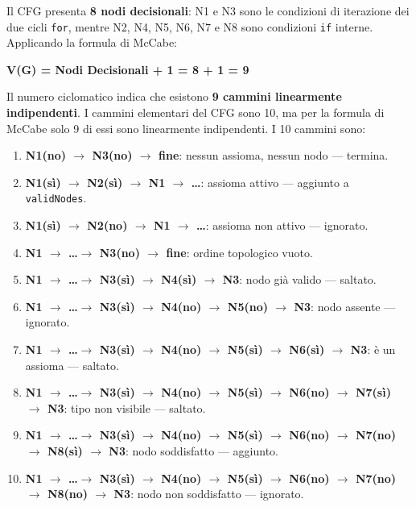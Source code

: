 \documentclass[12pt,a4paper]{article}
\begin{document}
Il CFG presenta \textbf{8 nodi decisionali}: N1 e N3 sono le condizioni di iterazione dei due cicli \texttt{for}, mentre N2, N4, N5, N6, N7 e N8 sono condizioni \texttt{if} interne. Applicando la formula di McCabe:

\textbf{V(G) = Nodi Decisionali + 1 = 8 + 1 = 9}

Il numero ciclomatico indica che esistono \textbf{9 cammini linearmente indipendenti}. I cammini elementari del CFG sono 10, ma per la formula di McCabe solo 9 di essi sono linearmente indipendenti. I 10 cammini sono:

\begin{enumerate}
    \item \textbf{N1(no) $\rightarrow$ N3(no) $\rightarrow$ fine}: nessun assioma, nessun nodo — termina.
    \item \textbf{N1(sì) $\rightarrow$ N2(sì) $\rightarrow$ N1 $\rightarrow$ \ldots}: assioma attivo — aggiunto a \texttt{validNodes}.
    \item \textbf{N1(sì) $\rightarrow$ N2(no) $\rightarrow$ N1 $\rightarrow$ \ldots}: assioma non attivo — ignorato.
    \item \textbf{N1 $\rightarrow$ \ldots $\rightarrow$ N3(no) $\rightarrow$ fine}: ordine topologico vuoto.
    \item \textbf{N1 $\rightarrow$ \ldots $\rightarrow$ N3(sì) $\rightarrow$ N4(sì) $\rightarrow$ N3}: nodo già valido — saltato.
    \item \textbf{N1 $\rightarrow$ \ldots $\rightarrow$ N3(sì) $\rightarrow$ N4(no) $\rightarrow$ N5(no) $\rightarrow$ N3}: nodo assente — ignorato.
    \item \textbf{N1 $\rightarrow$ \ldots $\rightarrow$ N3(sì) $\rightarrow$ N4(no) $\rightarrow$ N5(sì) $\rightarrow$ N6(sì) $\rightarrow$ N3}: è un assioma — saltato.
    \item \textbf{N1 $\rightarrow$ \ldots $\rightarrow$ N3(sì) $\rightarrow$ N4(no) $\rightarrow$ N5(sì) $\rightarrow$ N6(no) $\rightarrow$ N7(sì) $\rightarrow$ N3}: tipo non visibile — saltato.
    \item \textbf{N1 $\rightarrow$ \ldots $\rightarrow$ N3(sì) $\rightarrow$ N4(no) $\rightarrow$ N5(sì) $\rightarrow$ N6(no) $\rightarrow$ N7(no) $\rightarrow$ N8(sì) $\rightarrow$ N3}: nodo soddisfatto — aggiunto.
    \item \textbf{N1 $\rightarrow$ \ldots $\rightarrow$ N3(sì) $\rightarrow$ N4(no) $\rightarrow$ N5(sì) $\rightarrow$ N6(no) $\rightarrow$ N7(no) $\rightarrow$ N8(no) $\rightarrow$ N3}: nodo non soddisfatto — ignorato.
\end{enumerate}
\end{document}
